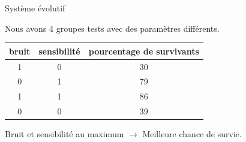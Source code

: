 \documentclass[aspectratio=43, a4paper, 12pt]{beamer}
\begin{document}
\begin{frame}{Système évolutif}	

\begin{center}Nous avons 4 groupes tests avec des paramètres différents.\end{center}

\begin{center}\begin{tabular}{|c|c|c|} \hline	
          \centering	
			bruit & sensibilité & pourcentage de survivants \\ \hline
			1 & 0 & 30 \\ \hline
			0 & 1 & 79 \\ \hline
			1 & 1 & 86 \\ \hline
			0 & 0 & 39 \\ \hline
		\end{tabular}\end{center}
		
\begin{center}Bruit et sensibilité au maximum $\rightarrow$ Meilleure chance de survie.\end{center}
\end{frame}
\end{document}
